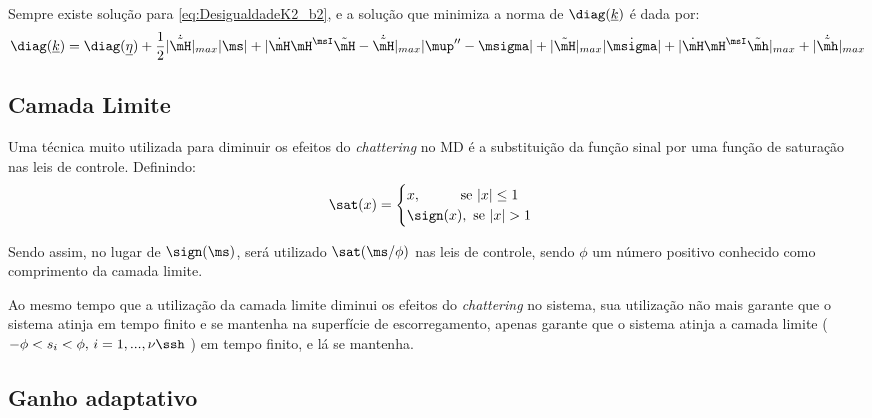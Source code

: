 \documentclass[]{politex}
\begin{document}
\begin{itemize}
\begin{itemize}
Sempre existe solu\c{c}\~ao para \eqref{eq:DesigualdadeK2_b2}, e a solução que minimiza a norma de $\diag(\underline{k})$ é dada por:
\begin{equation} \label{eq:MatrizDiagk_b2}
\diag(\underline{k})  = \diag(\underline{\eta}) + \frac{1}{2}|\dot{\tilde{\mH}}|_{max} |\ms| + | \dot{\mH} \mH^\msI \tilde{\mH} -\dot{\tilde{\mH}}|_{max} 	|\mup'' - \msigma | + |\tilde{\mH}|_{max} |\dot{\msigma}| + |\dot{\mH} \mH^\msI \tilde{\mh}|_{max} + |\dot{\tilde{\mh}}|_{max}
\end{equation}

\end{itemize}



\end{itemize}

\subsection{Camada Limite}

Uma técnica muito utilizada para diminuir os efeitos do \emph{chattering} no MD é a substituição da função sinal por uma função de saturação nas leis de controle. Definindo:
\begin{equation}
\sat(x) = \begin{cases}
x, \;\;\;\;\;\;\;\;\; \text{ se } |x| \leq 1 \\
\sign(x), \text{ se } |x| > 1
\end{cases}
\end{equation}

Sendo assim, no lugar de $\sign(\ms)$, será utilizado $\sat(\ms / \phi)$ nas leis de controle, sendo $\phi$ um número positivo conhecido como comprimento da camada limite.

Ao mesmo tempo que a utilização da camada limite diminui os efeitos do \emph{chattering} no sistema, sua utilização não mais garante que o sistema atinja em tempo finito e se mantenha na superfície de escorregamento, apenas garante que o sistema atinja a camada limite ( $-\phi < s_i < \phi, \, i = 1,...,\nu\ssh $ ) em tempo finito, e lá se mantenha. 


\subsection{Ganho adaptativo}
\end{document}
